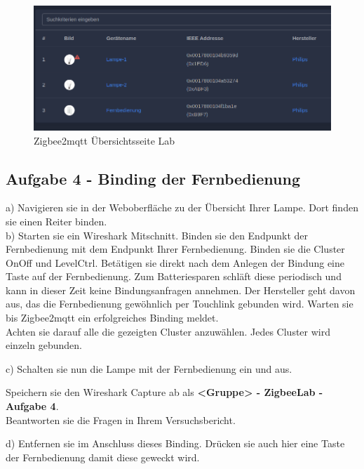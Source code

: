 \begin{figure}[H]
    \centering
    \includegraphics[width=1\textwidth]{media/z2m-ov.png}
    \caption{Zigbee2mqtt Übersichtsseite Lab}
\end{figure}


\subsection{Aufgabe 4 - Binding der Fernbedienung}

a) Navigieren sie in der Weboberfläche zu der Übersicht Ihrer Lampe. Dort finden sie einen Reiter \grqq binden\grqq{}. \\
b) Starten sie ein Wireshark Mitschnitt. Binden sie den Endpunkt der Fernbedienung mit dem Endpunkt Ihrer Fernbedienung. Binden sie die Cluster \grqq OnOff\grqq{}
und \grqq LevelCtrl\grqq{}. Betätigen sie direkt nach dem Anlegen der Bindung eine Taste auf der Fernbedienung. Zum Batteriesparen \grqq schläft\grqq{} diese 
periodisch und kann in dieser Zeit keine Bindungsanfragen annehmen. Der Hersteller geht davon aus, das die Fernbedienung gewöhnlich per Touchlink gebunden wird. 
Warten sie bis Zigbee2mqtt ein erfolgreiches Binding meldet. \\



Achten sie darauf alle die gezeigten Cluster anzuwählen. Jedes Cluster wird einzeln gebunden.

c) Schalten sie nun die Lampe mit der Fernbedienung ein und aus. 

\begin{Hinweis}
    Speichern sie den Wireshark Capture ab als \textbf{\grqq <Gruppe> - ZigbeeLab - Aufgabe 4\grqq{}}. \\
    Beantworten sie die Fragen in Ihrem Versuchsbericht.
\end{Hinweis}

d) Entfernen sie im Anschluss dieses Binding. Drücken sie auch hier eine Taste der Fernbedienung damit diese geweckt wird.

